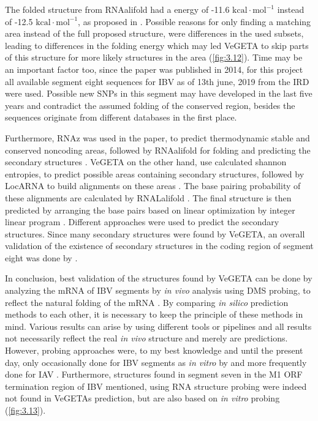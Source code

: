     The folded structure from RNAalifold had a energy of -11.6 $\text{kcal}\cdot \text{mol}^{-1}$ instead of -12.5 $\text{kcal}\cdot \text{mol}^{-1}$, as proposed in \textcite{structure_BC}. Possible reasons for only finding a matching area instead of the full proposed structure, were differences in the used subsets, leading to differences in the folding energy which may led VeGETA to skip parts of this structure for more likely structures in the area (\autoref{fig:3.12}). Time may be an important factor too, since the paper was published in 2014, for this project all available segment eight sequences for \gls{IBV} as of 13th june, 2019 from the \gls{IRD} were used. Possible new \glspl{SNP} in this segment may have developed in the last five years and contradict the assumed folding of the conserved region, besides the sequences originate from different databases in the first place.  
    
    Furthermore, RNAz was used in the paper, to predict thermodynamic stable and conserved noncoding areas, followed by RNAalifold for folding and predicting the secondary structures \autocite{structure_BC, Vienna, rnaz}. VeGETA on the other hand, use calculated shannon entropies, to predict possible areas containing secondary structures, followed by LocARNA to build alignments on these areas \autocite{vegeta, locarna}. The base pairing probability of these alignments are calculated by RNALalifold \autocite{Vienna}. The final structure is then predicted by arranging the base pairs based on linear optimization by integer linear program \autocite{vegeta}. Different approaches were used to predict the secondary structures. Since many secondary structures were found by VeGETA, an overall validation of the existence of secondary structures in the coding region of segment eight was done by \textcite{gors}. %
    
    In conclusion, best validation of the structures found by VeGETA can be done by analyzing the \gls{mRNA} of \gls{IBV} segments by \textit{in vivo} analysis using \gls{DMS} probing, to reflect the natural folding of the \gls{mRNA} \autocite{probing}. By comparing \textit{in silico} prediction methods to each other, it is necessary to keep the principle of these methods in mind. Various results can arise by using different tools or pipelines and all results not necessarily reflect the real \textit{in vivo} structure and merely are predictions. However, probing approaches were, to my best knowledge and until the present day, only occasionally done for \gls{IBV} segments as \textit{in vitro} by \textcite{probe_B} and more frequently done for \gls{IAV} \autocite{probing}. Furthermore, structures found in segment seven in the \gls{M1} \gls{ORF} termination region of \gls{IBV} mentioned, \textcite{probe_B} using RNA structure probing were indeed not found in VeGETAs prediction, but are also based on \textit{in vitro} probing (\autoref{fig:3.13}). 